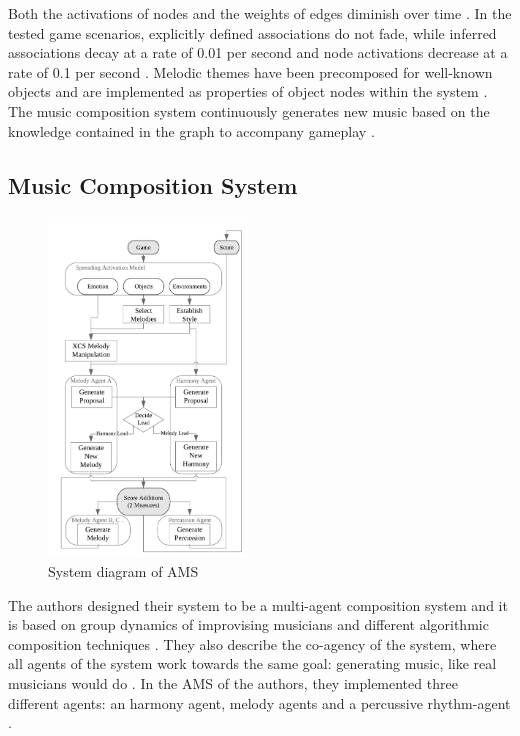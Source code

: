 Both the activations of nodes and the weights of edges diminish
over time \cite{hutMcCormAms}. In the tested game scenarios, 
explicitly defined associations do not fade, while inferred 
associations decay at a rate of 0.01 per second and node 
activations decrease at a rate of 0.1 per second
\cite{hutMcCormAms}.
Melodic themes have been precomposed for well-known objects and are implemented as properties of object nodes within the system \cite{hutMcCormAms}. The music composition system continuously generates new music based on the knowledge contained in the graph to accompany gameplay \cite{hutMcCormAms}. 

\subsection{Music Composition System}

\begin{figure}[h]
    \centering
    \includegraphics[height=9cm]{images/ams_system_diagram.png}
    \caption{System diagram of AMS \cite{hutMcCormAms}}
    \label{fig:ams_system_diagram}
\end{figure}

The authors designed their system to be a multi-agent composition system \cite{hutMcCormAms} and it is based on group dynamics of 
improvising musicians and different algorithmic composition
techniques \cite{hutMcCormAms}.
They also describe the co-agency of the system, where all agents
of the system work towards the same goal: generating music, like
real musicians would do \cite{hutMcCormAms}.
In the AMS of the authors, they implemented three different agents:
an harmony agent, melody agents and a percussive rhythm-agent \cite{hutMcCormAms}.

